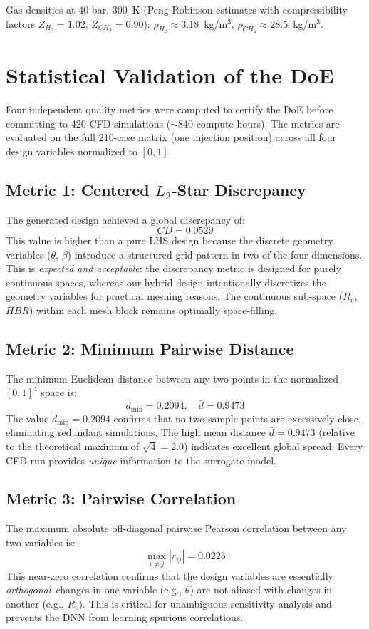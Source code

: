 \documentclass[12pt, a4paper]{report}
\begin{document}
\noindent Gas densities at 40 bar, 300~K (Peng-Robinson estimates with compressibility factors $Z_{H_2} = 1.02$, $Z_{CH_4} = 0.90$): $\rho_{H_2} \approx 3.18$~kg/m$^3$, $\rho_{CH_4} \approx 28.5$~kg/m$^3$.

\section{Statistical Validation of the DoE}

Four independent quality metrics were computed to certify the DoE before committing to 420 CFD simulations ($\sim$840 compute hours). The metrics are evaluated on the full 210-case matrix (one injection position) across all four design variables normalized to $[0,1]$.

\subsection{Metric 1: Centered $L_2$-Star Discrepancy}
The generated design achieved a global discrepancy of:
\begin{equation}
    CD = 0.0529
\end{equation}
This value is higher than a pure LHS design because the discrete geometry variables ($\theta$, $\beta$) introduce a structured grid pattern in two of the four dimensions. This is \textit{expected and acceptable}: the discrepancy metric is designed for purely continuous spaces, whereas our hybrid design intentionally discretizes the geometry variables for practical meshing reasons. The continuous sub-space ($R_v$, $HBR$) within each mesh block remains optimally space-filling.

\subsection{Metric 2: Minimum Pairwise Distance}
The minimum Euclidean distance between any two points in the normalized $[0,1]^4$ space is:
\begin{equation}
    d_{\min} = 0.2094, \quad \bar{d} = 0.9473
\end{equation}
The value $d_{\min} = 0.2094$ confirms that no two sample points are excessively close, eliminating redundant simulations. The high mean distance $\bar{d} = 0.9473$ (relative to the theoretical maximum of $\sqrt{4} = 2.0$) indicates excellent global spread. Every CFD run provides \textit{unique} information to the surrogate model.

\subsection{Metric 3: Pairwise Correlation}
The maximum absolute off-diagonal pairwise Pearson correlation between any two variables is:
\begin{equation}
    \max_{i \neq j} |r_{ij}| = 0.0225
\end{equation}
This near-zero correlation confirms that the design variables are essentially \textit{orthogonal}--changes in one variable (e.g., $\theta$) are not aliased with changes in another (e.g., $R_v$). This is critical for unambiguous sensitivity analysis and prevents the DNN from learning spurious correlations.
\end{document}
